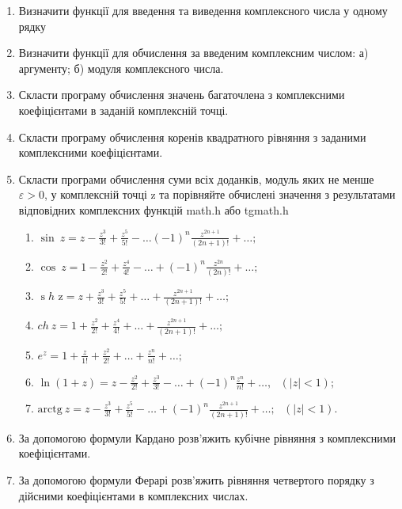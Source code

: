 \documentclass[]{article}
\makeatletter
\newcommand{\xslalph}[1]{\expandafter\@xslalph\csname c@#1\endcsname}
\newcommand{\@xslalph}[1]{%
    \ifcase#1\or а\or б\or в\or г\or д\or e\or є\or ж\or з\or i%
    \or й\or к\or л\or м\or н\or о\or п\or р\or с\or т%
    \or у\or ф\or х\or ц\or ч\or ш\or ю\or я\or аа\or бб\or вв %
    \else\@ctrerr\fi%
}
\makeatother
\begin{document}
\begin{enumerate}
\item
Визначити функції для введення та виведення комплексного числа у одному
рядку
\item
Визначити функції для обчислення за введеним комплексним числом:
а) аргументу;
б) модуля комплексного числа.

\item
Скласти програму обчислення значень багаточлена з комплексними
коефіцієнтами в заданій комплексній точці.
\item
Скласти програму обчислення коренів квадратного рівняння з заданими
комплексними коефіцієнтами.
\item
Скласти програми обчислення суми всіх доданків, модуль яких не менше 
$\varepsilon > 0$, у комплексній точці z та порівняйте обчислені значення
з результатами відповідних комплексних функцій math.h або tgmath.h
  \begin{enumerate}[label=\xslalph*)]
\item

\(\sin\ z = z - \frac{z^{3}}{3!} + \frac{z^{5}}{5!} - \ldots( - 1)^{n}\frac{z^{2n + 1}}{(2n + 1)!} + \ldots;\)
\item
\(\cos\ z = 1 - \frac{z^{2}}{2!} + \frac{z^{4}}{4!} - \ldots + ( - 1)^{n}\frac{z^{2n}}{(2n)!} + \ldots;\)
\item
\(\operatorname{s}h\mathrm{\text{\ z}} = z + \frac{z^{3}}{3!} + \frac{z^{5}}{5!} + \ldots + \frac{z^{2n + 1}}{(2n + 1)!} + \ldots;\)
\item
\(ch\ z = 1 + \frac{z^{2}}{2!} + \frac{z^{4}}{4!} + \ldots + \frac{z^{2n + 1}}{(2n + 1)!} + \ldots;\)
\item
\(e^{z} = 1 + \frac{z}{1!} + \frac{z^{2}}{2!} + \ldots + \frac{z^{n}}{n!} + \ldots;\)
\item
\(\ln(1 + z) = z - \frac{z^{2}}{2!} + \frac{z^{3}}{3!} - \ldots + ( - 1)^{n}\frac{z^{n}}{n!} + \ldots,\mathrm{\text{\ \ \ \ \ }}(\left| z \right| < 1);\)
\item
\(\mathrm{\text{arctg}}\mathrm{\ }z = z - \frac{z^{3}}{3!} + \frac{z^{5}}{5!} - \ldots + ( - 1)^{n}\frac{z^{2n + 1}}{\left( 2n + 1 \right)!} + \ldots;\mathrm{\text{\ \ \ }}\left( \left| z \right| < 1 \right).\)
\end{enumerate}
\item
За допомогою формули Кардано розв'яжить кубічне рівняння з комплексними
коефіцієнтами.
\item
За допомогою формули Ферарі розв'яжить рівняння четвертого порядку з
дійсними коефіцієнтами в комплексних числах.
\end{enumerate}
\end{document}
